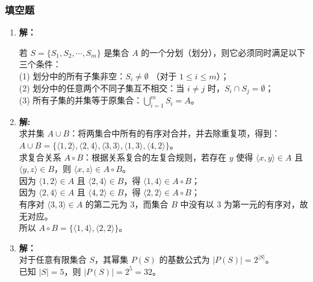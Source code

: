 \subsubsection{填空题}

\begin{enumerate}
	\item \textbf{解：}
	
	若 $S = \{S_1, S_2, \cdots, S_m\}$ 是集合 $A$ 的一个分划（划分），则它必须同时满足以下三个条件：\\
	(1) 划分中的所有子集非空：$S_i \neq \emptyset$ （对于 $1 \le i \le m$）；\\
	(2) 划分中的任意两个不同子集互不相交：当 $i \neq j$ 时，$S_i \cap S_j = \emptyset$；\\
	(3) 所有子集的并集等于原集合：$\bigcup_{i=1}^m S_i = A$。
	
	\vspace{1em}
	
	\item \textbf{解:}\\
	求并集 $A \cup B$：将两集合中所有的有序对合并，并去除重复项，得到：\\
	$A \cup B = \{\langle 1,2 \rangle, \langle 2,4 \rangle, \langle 3,3 \rangle, \langle 1,3 \rangle, \langle 4,2 \rangle\}$。\\
	求复合关系 $A \circ B$：根据关系复合的左复合规则，若存在 $y$ 使得 $\langle x,y \rangle \in A$ 且 $\langle y,z \rangle \in B$，则 $\langle x,z \rangle \in A \circ B$。\\
	因为 $\langle 1,2 \rangle \in A$ 且 $\langle 2,4 \rangle \in B$，得 $\langle 1,4 \rangle \in A \circ B$；\\
	因为 $\langle 2,4 \rangle \in A$ 且 $\langle 4,2 \rangle \in B$，得 $\langle 2,2 \rangle \in A \circ B$；\\
	有序对 $\langle 3,3 \rangle \in A$ 的第二元为 3，而集合 $B$ 中没有以 3 为第一元的有序对，故无对应。\\
	所以 $A \circ B = \{ \langle 1,4 \rangle, \langle 2,2 \rangle \}$。
	
	\vspace{1em}
	
	\item \textbf{解：}\\
	对于任意有限集合 $S$，其幂集 $P(S)$ 的基数公式为 $|P(S)| = 2^{|S|}$。\\
	已知 $|S| = 5$，则 $|P(S)| = 2^5 = 32$。
	
	\vspace{1em}
	

\end{enumerate}
